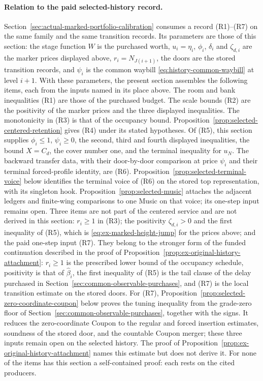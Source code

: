 \paragraph{Relation to the paid selected-history record.}
Section~\ref{sec:actual-marked-portfolio-calibration} consumes a record
(R1)--(R7) on the same family and the same transition records. Its
parameters are those of this section: the stage function $W$ is the
purchased worth, $u_i=\eta_i$, $\phi_i$, $\delta_i$ and $\zeta_{d,i}$
are the marker prices displayed above, $r_i=N_{J(i+1)}$, the doors are
the stored transition records, and $\psi_i$ is the common waybill
\eqref{eq:history-common-waybill} at level $i+1$. With these
parameters, the present section assembles the following items, each from
the inputs named in its place above. The room and bank inequalities (R1)
are those of the purchased budget. The scale bounds (R2) are the
positivity of the marker prices and the three displayed inequalities.
The monotonicity in (R3) is that of the occupancy bound. Proposition~\ref{prop:selected-centered-retention} gives (R4) under
its stated hypotheses. Of (R5), this section supplies $\phi_i\le1$,
$\psi_i\ge0$, the second, third and fourth displayed inequalities, the
bound $X=C_d$, the cover number one, and the terminal inequality for
$u_N$. The backward transfer data, with their door-by-door comparison at
price $\psi_i$ and their terminal forced-profile identity, are (R6).
Proposition~\ref{prop:selected-terminal-voice} below identifies the
terminal voice of (R6) on the stored top representation, with its
singleton hook. Proposition~\ref{prop:selected-music} attaches the
adjacent ledgers and finite-wing comparisons to one Music on that voice;
its one-step input remains open.
Three items are not part of the centered service and are not derived in
this section: $r_i\ge1$ in (R3); the positivity $\zeta_{d,i}>0$ and the
first inequality of (R5), which is
\eqref{eq:ex-marked-height-jump} for the prices above; and the paid
one-step input (R7). They belong to the stronger form of the funded
continuation described in the proof of
Proposition~\ref{prop:ex-original-history-attachment}: $r_i\ge1$ is the
prescribed lower bound of the occupancy schedule, positivity is that of
$\widehat\beta_i$, the first inequality of (R5) is the tail clause of
the delay purchased in Section~\ref{sec:common-observable-purchases},
and (R7) is the local transition estimate on the stored doors. For
(R7), Proposition~\ref{prop:selected-zero-coordinate-coupon} below
proves the tuning inequality from the grade-zero floor of
Section~\ref{sec:common-observable-purchases}, together with the signs.
It reduces the zero-coordinate Coupon to the regular and forced
insertion estimates, soundness of the stored door, and the countable
Coupon merger; these three inputs remain open on the selected history.
The proof of Proposition~\ref{prop:ex-original-history-attachment}
names this estimate but does not derive it. For none of the items has
this section a self-contained proof: each rests on the cited
producers.

